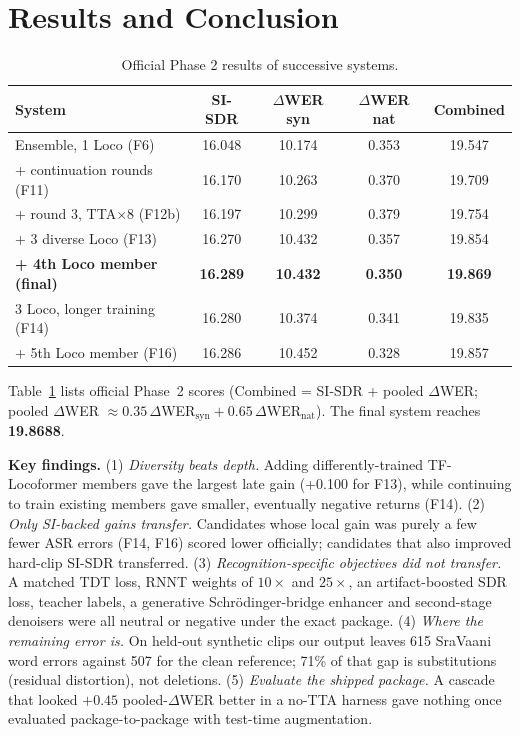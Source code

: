 \documentclass[conference]{IEEEtran}
\begin{document}
\section{Results and Conclusion}
\begin{table}[t]
\centering
\caption{Official Phase 2 results of successive systems.}
\label{tab:official}
\begin{tabular}{lcccc}
\toprule
System & SI-SDR & $\Delta$WER syn & $\Delta$WER nat & Combined \\
\midrule
Ensemble, 1 Loco (F6) & 16.048 & 10.174 & 0.353 & 19.547 \\
+ continuation rounds (F11) & 16.170 & 10.263 & 0.370 & 19.709 \\
+ round 3, TTA$\times$8 (F12b) & 16.197 & 10.299 & 0.379 & 19.754 \\
+ 3 diverse Loco (F13) & 16.270 & 10.432 & 0.357 & 19.854 \\
\textbf{+ 4th Loco member (final)} & \textbf{16.289} & \textbf{10.432} & \textbf{0.350} & \textbf{19.869} \\
\midrule
3 Loco, longer training (F14) & 16.280 & 10.374 & 0.341 & 19.835 \\
+ 5th Loco member (F16) & 16.286 & 10.452 & 0.328 & 19.857 \\
\bottomrule
\end{tabular}
\end{table}

Table~\ref{tab:official} lists official Phase~2 scores (Combined = SI-SDR + pooled $\Delta$WER; pooled
$\Delta$WER $\approx 0.35\,\Delta$WER$_{\mathrm{syn}} + 0.65\,\Delta$WER$_{\mathrm{nat}}$). The final system
reaches \textbf{19.8688}.

\textbf{Key findings.} (1) \emph{Diversity beats depth.} Adding differently-trained TF-Locoformer members gave the
largest late gain (+0.100 for F13), while continuing to train existing members gave smaller, eventually negative
returns (F14). (2) \emph{Only SI-backed gains transfer.} Candidates whose local gain was purely a few fewer ASR
errors (F14, F16) scored lower officially; candidates that also improved hard-clip SI-SDR transferred. (3)
\emph{Recognition-specific objectives did not transfer.} A matched TDT loss, RNNT weights of $10\times$ and
$25\times$, an artifact-boosted SDR loss, teacher labels, a generative Schr\"odinger-bridge enhancer and
second-stage denoisers were all neutral or negative under the exact package. (4) \emph{Where the remaining error
is.} On held-out synthetic clips our output leaves 615 SraVaani word errors against 507 for the clean reference;
71\% of that gap is substitutions (residual distortion), not deletions. (5) \emph{Evaluate the shipped package.}
A cascade that looked $+0.45$ pooled-$\Delta$WER better in a no-TTA harness gave nothing once evaluated
package-to-package with test-time augmentation.
\end{document}
